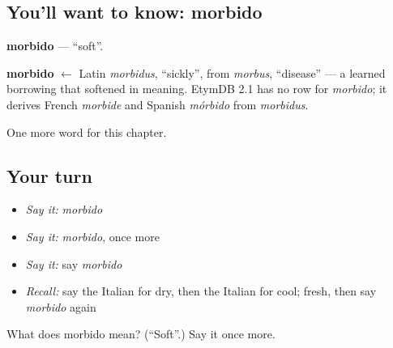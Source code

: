 \subsection*{You'll want to know: morbido}
\textbf{morbido} — \textquotedblleft{}soft\textquotedblright{}.

\begin{cousinweb}
\textbf{morbido} $\leftarrow$ Latin \emph{morbidus}, \textquotedblleft{}sickly\textquotedblright{}, from \emph{morbus}, \textquotedblleft{}disease\textquotedblright{} — a learned borrowing that softened in meaning. EtymDB 2.1 has no row for \emph{morbido}; it derives French \emph{morbide} and Spanish \emph{mórbido} from \emph{morbidus}.
\end{cousinweb}

\begin{grammarlens}[title={What you've built}]
One more word for this chapter.
\end{grammarlens}

\subsection*{Your turn}
\begin{itemize}
\raggedright
  \item \emph{Say it:} \emph{morbido}
  \item \emph{Say it:} \emph{morbido}, once more
  \item \emph{Say it:} say \emph{morbido}
  \item \emph{Recall:} say the Italian for dry, then the Italian for cool; fresh, then say \emph{morbido} again
\end{itemize}

\begin{tcolorbox}[breakable,colback=teal!4,colframe=teal!35!black,title={Before you move on}]
What does morbido mean? (\textquotedblleft{}Soft\textquotedblright{}.) Say it once more.
\end{tcolorbox}
